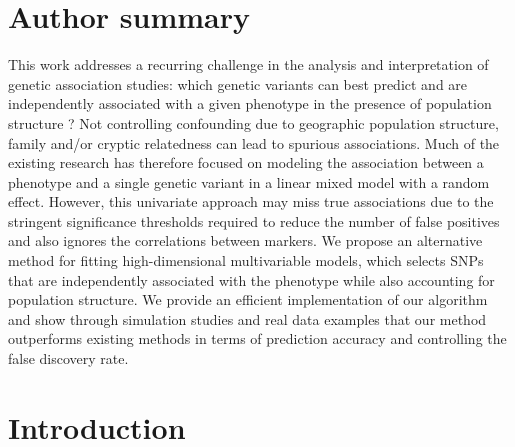 \documentclass[10pt,letterpaper]{article}
\begin{document}
\section*{Author summary}
This work addresses a recurring challenge in the analysis and interpretation of genetic association studies: which genetic variants can best predict and are independently associated with a given phenotype in the presence of population structure ? Not controlling confounding due to geographic population structure, family and/or cryptic relatedness can lead to spurious associations. Much of the existing research has therefore focused on modeling the association between a phenotype and a single genetic variant in a linear mixed model with a random effect. However, this univariate approach may miss true associations due to the stringent significance thresholds required to reduce the number of false positives and also ignores the correlations between markers. We propose an alternative method for fitting high-dimensional multivariable models, which selects SNPs that are independently associated with the phenotype while also accounting for population structure. We provide an efficient implementation of our algorithm and show through simulation studies and real data examples that our method outperforms existing methods in terms of prediction accuracy and controlling the false discovery rate. 


\linenumbers

\section*{Introduction}
\end{document}
